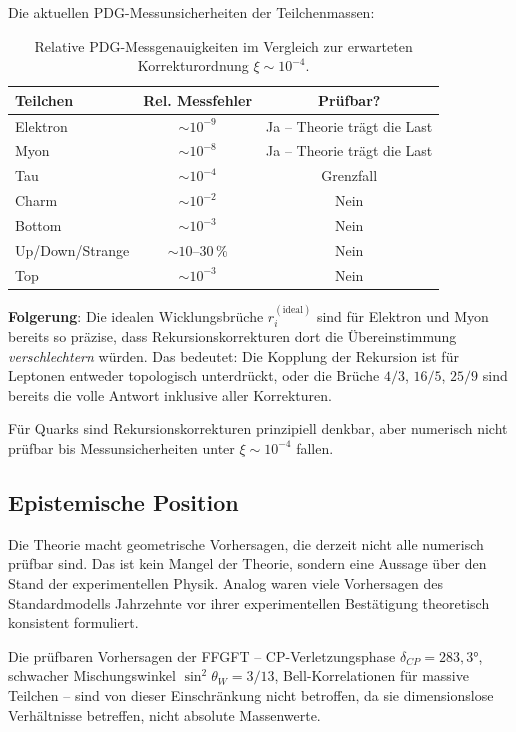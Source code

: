 Die aktuellen PDG-Messunsicherheiten der Teilchenmassen:

\begin{table}[htbp]
\centering
\begin{tabular}{lcc}
\toprule
\textbf{Teilchen} & \textbf{Rel. Messfehler} & \textbf{Prüfbar?} \\
\midrule
Elektron & $\sim 10^{-9}$ & Ja -- Theorie trägt die Last \\
Myon     & $\sim 10^{-8}$ & Ja -- Theorie trägt die Last \\
Tau      & $\sim 10^{-4}$ & Grenzfall \\
Charm    & $\sim 10^{-2}$ & Nein \\
Bottom   & $\sim 10^{-3}$ & Nein \\
Up/Down/Strange & $\sim 10\text{--}30\,\%$ & Nein \\
Top      & $\sim 10^{-3}$ & Nein \\
\bottomrule
\end{tabular}
\caption{Relative PDG-Messgenauigkeiten im Vergleich zur erwarteten
Korrekturordnung $\xi \sim 10^{-4}$.}
\label{tab:messgenauigkeit}
\end{table}

\textbf{Folgerung}: Die idealen Wicklungsbrüche $r_i^{(\mathrm{ideal})}$
sind für Elektron und Myon bereits so präzise, dass Rekursionskorrekturen
dort die Übereinstimmung \emph{verschlechtern} würden. Das bedeutet:
Die Kopplung der Rekursion ist für Leptonen entweder topologisch
unterdrückt, oder die Brüche $4/3$, $16/5$, $25/9$ sind bereits
die volle Antwort inklusive aller Korrekturen.

Für Quarks sind Rekursionskorrekturen prinzipiell denkbar, aber
numerisch nicht prüfbar bis Messunsicherheiten unter $\xi \sim 10^{-4}$
fallen.

\subsection{Epistemische Position}

Die Theorie macht geometrische Vorhersagen, die derzeit nicht alle
numerisch prüfbar sind. Das ist kein Mangel der Theorie, sondern
eine Aussage über den Stand der experimentellen Physik. Analog
waren viele Vorhersagen des Standardmodells Jahrzehnte vor ihrer
experimentellen Bestätigung theoretisch konsistent formuliert.

Die prüfbaren Vorhersagen der FFGFT -- CP-Verletzungsphase
$\delta_{CP} = 283{,}3°$, schwacher Mischungswinkel $\sin^2\theta_W = 3/13$,
Bell-Korrelationen für massive Teilchen -- sind von dieser
Einschränkung nicht betroffen, da sie dimensionslose Verhältnisse
betreffen, nicht absolute Massenwerte.


